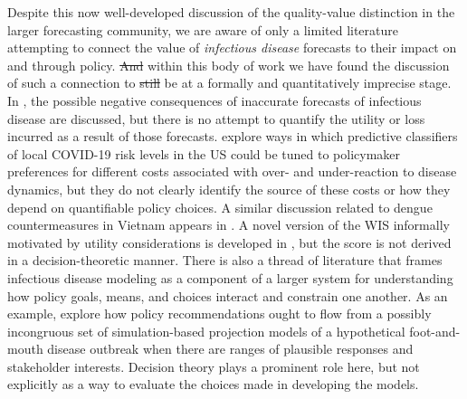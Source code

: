 \documentclass{article}\usepackage[]{graphicx}\usepackage[]{xcolor}
\providecommand{\DIFaddtex}[1]{{\protect\color{blue}\uwave{#1}}} %
\providecommand{\DIFdeltex}[1]{{\protect\color{red}\sout{#1}}}                      %
\providecommand{\DIFaddbegin}{} %
\providecommand{\DIFaddend}{} %
\providecommand{\DIFdelbegin}{} %
\providecommand{\DIFdelend}{} %
\providecommand{\DIFadd}[1]{\texorpdfstring{\DIFaddtex{#1}}{#1}} %
\providecommand{\DIFdel}[1]{\texorpdfstring{\DIFdeltex{#1}}{}} %
\newcommand{\DIFscaledelfig}{0.5}
\newlength{\DIFdelgraphicswidth} %
\newlength{\DIFdelgraphicsheight} %
\newcommand{\DIFaddincludegraphics}[2][]{{\color{blue}\fbox{\DIFOincludegraphics[#1]{#2}}}} %
\newcommand{\DIFdelincludegraphics}[2][]{%
\sbox{\DIFdelgraphicsbox}{\DIFOincludegraphics[#1]{#2}}%
\settoboxwidth{\DIFdelgraphicswidth}{\DIFdelgraphicsbox} %
\settoboxtotalheight{\DIFdelgraphicsheight}{\DIFdelgraphicsbox} %
\scalebox{\DIFscaledelfig}{%
\parbox[b]{\DIFdelgraphicswidth}{\usebox{\DIFdelgraphicsbox}\\[-\baselineskip] \rule{\DIFdelgraphicswidth}{0em}}\llap{\resizebox{\DIFdelgraphicswidth}{\DIFdelgraphicsheight}{%
\setlength{\unitlength}{\DIFdelgraphicswidth}%
\begin{picture}(1,1)%
\thicklines\linethickness{2pt} %
{\color[rgb]{1,0,0}\put(0,0){\framebox(1,1){}}}%
{\color[rgb]{1,0,0}\put(0,0){\line( 1,1){1}}}%
{\color[rgb]{1,0,0}\put(0,1){\line(1,-1){1}}}%
\end{picture}%
}\hspace*{3pt}}} %
} %
\DeclareRobustCommand{\DIFaddbegin}{\DIFOaddbegin \let\includegraphics\DIFaddincludegraphics} %
\DeclareRobustCommand{\DIFaddend}{\DIFOaddend \let\includegraphics\DIFOincludegraphics} %
\DeclareRobustCommand{\DIFdelbegin}{\DIFOdelbegin \let\includegraphics\DIFdelincludegraphics} %
\DeclareRobustCommand{\DIFdelend}{\DIFOaddend \let\includegraphics\DIFOincludegraphics} %
\begin{document}
Despite this now well-developed discussion of the quality-value distinction in the larger forecasting community, we are
aware of only a limited literature attempting to connect the value of \emph{infectious disease} forecasts to their
impact on and through policy.  \DIFdelbegin \DIFdel{And }\DIFdelend \DIFaddbegin \DIFadd{Even }\DIFaddend within this body of work we have found the discussion of such a connection to
\DIFdelbegin \DIFdel{still
}\DIFdelend be at a formally and quantitatively imprecise stage. In \cite{ioannidis2022forecastingCOVIDfailed}, the possible negative
consequences of inaccurate forecasts of infectious disease are discussed, but there is no attempt to quantify the
utility or loss incurred as a result of those forecasts. \cite{bilinski_adaptive_2023} explore ways in which predictive
classifiers of local COVID-19 risk levels in the US could be tuned to policymaker preferences for different costs
associated with over- and under-reaction to disease dynamics, but they do not clearly identify the source of these
costs or how they depend on quantifiable policy choices. A similar discussion related to dengue countermeasures in
Vietnam appears in \cite{colon-gonzalez_probabilistic_2021}.  A novel version of the WIS informally motivated by
utility considerations is developed in \cite{marshall2023predictions}, but the score is not derived in a
decision-theoretic manner.  There is also a thread of literature that frames infectious disease modeling as a component
of a larger system for understanding how policy goals, means, and choices interact and constrain one another. As an
example, \cite{Probert2016decisionMakingFootMouth} explore how policy recommendations ought to flow from a possibly 
incongruous set of simulation-based projection models of a hypothetical foot-and-mouth disease outbreak when there are 
ranges of plausible responses and stakeholder interests. Decision theory plays a prominent role here, but not explicitly
as a way to evaluate the choices made in developing the models.
\end{document}
